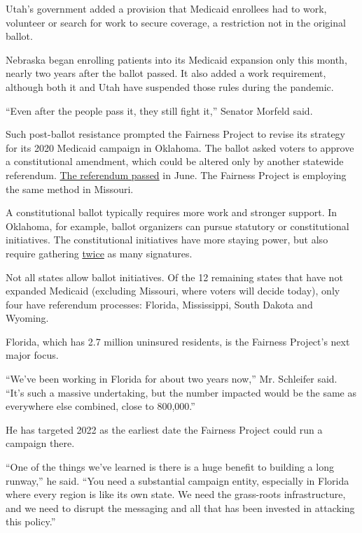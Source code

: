 Utah's government added a provision that Medicaid enrollees had to work,
volunteer or search for work to secure coverage, a restriction not in
the original ballot.

Nebraska began enrolling patients into its Medicaid expansion only this
month, nearly two years after the ballot passed. It also added a work
requirement, although both it and Utah have suspended those rules during
the pandemic.

``Even after the people pass it, they still fight it,'' Senator Morfeld
said.

Such post-ballot resistance prompted the Fairness Project to revise its
strategy for its 2020 Medicaid campaign in Oklahoma. The ballot asked
voters to approve a constitutional amendment, which could be altered
only by another statewide referendum.
\href{https://www.nytimes3xbfgragh.onion/2020/07/01/upshot/oklahoma-obamacare-Republican-voters-expand.html}{The
referendum passed} in June. The Fairness Project is employing the same
method in Missouri.

A constitutional ballot typically requires more work and stronger
support. In Oklahoma, for example, ballot organizers can pursue
statutory or constitutional initiatives. The constitutional initiatives
have more staying power, but also require gathering
\href{https://ballotpedia.org/Laws_governing_the_initiative_process_in_Oklahoma}{twice}
as many signatures.

Not all states allow ballot initiatives. Of the 12 remaining states that
have not expanded Medicaid (excluding Missouri, where voters will decide
today), only four have referendum processes: Florida, Mississippi, South
Dakota and Wyoming.

Florida, which has 2.7 million uninsured residents, is the Fairness
Project's next major focus.

``We've been working in Florida for about two years now,'' Mr. Schleifer
said. ``It's such a massive undertaking, but the number impacted would
be the same as everywhere else combined, close to 800,000.''

He has targeted 2022 as the earliest date the Fairness Project could run
a campaign there.

``One of the things we've learned is there is a huge benefit to building
a long runway,'' he said. ``You need a substantial campaign entity,
especially in Florida where every region is like its own state. We need
the grass-roots infrastructure, and we need to disrupt the messaging and
all that has been invested in attacking this policy.''

